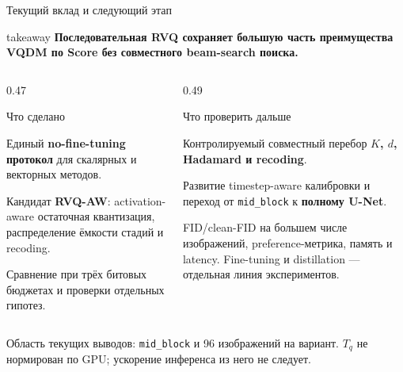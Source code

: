 \documentclass[aspectratio=169,10pt]{beamer}
\newcommand{\keypoint}[1]{%
  \begin{beamercolorbox}[
    sep=1.8mm,
    wd=\linewidth
  ]{takeaway}
    \small\bfseries #1
  \end{beamercolorbox}%
}
\newcommand{\midblock}{\texttt{mid\_block}}
\begin{document}

\begin{frame}[t]{Текущий вклад и следующий этап}
  \keypoint{
    Последовательная RVQ сохраняет большую часть
    преимущества VQDM по Score
    без совместного beam-search поиска.
  }

  \vspace{2mm}

  \begin{columns}[T,onlytextwidth]

    \begin{column}{0.47\textwidth}
      \begin{block}{Что сделано}
        \small

        Единый \textbf{no-fine-tuning протокол}
        для скалярных и векторных методов.
        \par\medskip

        Кандидат \textbf{RVQ-AW}:
        activation-aware остаточная квантизация,
        распределение ёмкости стадий и recoding.
        \par\medskip

        Сравнение при трёх битовых бюджетах
        и проверки отдельных гипотез.
      \end{block}
    \end{column}

    \begin{column}{0.49\textwidth}
      \begin{block}{Что проверить дальше}
        \small

        Контролируемый совместный перебор
        \textbf{$K$, $d$, Hadamard и recoding}.
        \par\medskip

        Развитие timestep-aware калибровки
        и переход от \midblock{}
        к \textbf{полному U-Net}.
        \par\medskip

        FID/clean-FID на большем числе изображений,
        preference-метрика, память и latency.
        Fine-tuning и distillation ---
        отдельная линия экспериментов.
      \end{block}
    \end{column}

  \end{columns}

  \vfill

  {\small\color{Muted}
    Область текущих выводов:
    \midblock{} и 96 изображений на вариант.
    $T_q$ не нормирован по GPU; ускорение инференса из него не следует.
  }
\end{frame}
\end{document}
